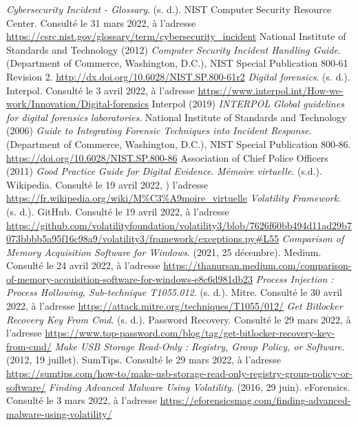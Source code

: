 \documentclass[a4paper, 12pt]{book}
\begin{document}
\begin{thebibliography}{9} 
     \textit{Cybersecurity Incident - Glossary}. (s. d.). NIST Computer Security Resource Center. Consulté le 31 mars 2022, à l’adresse \url{https://csrc.nist.gov/glossary/term/cybersecurity\_incident}
     National Institute of Standards and Technology (2012) \textit{Computer Security Incident Handling Guide}. (Department of Commerce, Washington, D.C.), NIST Special Publication 800-61 Revision 2. \url{http://dx.doi.org/10.6028/NIST.SP.800-61r2}
     \textit{Digital forensics}. (s. d.). Interpol. Consulté le 3 avril 2022, à l’adresse \url{https://www.interpol.int/How-we-work/Innovation/Digital-forensics}
     Interpol (2019) \textit{INTERPOL Global guidelines for digital forensics laboratories}.
     National Institute of Standards and Technology (2006) \textit{Guide to Integrating Forensic Techniques into Incident Response}. (Department of Commerce, Washington, D.C.), NIST Special Publication 800-86. \url{https://doi.org/10.6028/NIST.SP.800-86}
     Association of Chief Police Officers (2011) \textit{Good Practice Guide for Digital Evidence}.
     \textit{Mémoire virtuelle}. (s.d.). Wikipedia. Consulté le 19 avril 2022, ) l'adresse \url{https://fr.wikipedia.org/wiki/M\%C3\%A9moire_virtuelle}
     \textit{Volatility Framework}. (s. d.). GitHub. Consulté le 19 avril 2022, à l’adresse \url{https://github.com/volatilityfoundation/volatility3/blob/7626f60bb494d11ad29b7073bbbb5a95f16c98a9/volatility3/framework/exceptions.py\#L55}
     \textit{Comparison of Memory Acquisition Software for Windows}. (2021, 25 décembre). Medium. Consulté le 24 avril 2022, à l’adresse \url{https://thanursan.medium.com/comparison-of-memory-acquisition-software-for-windows-e8c6d981db23}
     \textit{Process Injection : Process Hollowing, Sub-technique T1055.012}. (s. d.). Mitre. Consulté le 30 avril 2022, à l’adresse \url{https://attack.mitre.org/techniques/T1055/012/}
     \textit{Get Bitlocker Recovery Key From Cmd}. (s. d.). Password Recovery. Consulté le 29 mars 2022, à l’adresse \url{https://www.top-password.com/blog/tag/get-bitlocker-recovery-key-from-cmd/}
     \textit{Make USB Storage Read-Only : Registry, Group Policy, or Software}. (2012, 19 juillet). SumTips. Consulté le 29 mars 2022, à l’adresse \url{https://sumtips.com/how-to/make-usb-storage-read-only-registry-group-policy-or-software/}
     \textit{Finding Advanced Malware Using Volatility}. (2016, 29 juin). eForensics. Consulté le 3 mars 2022, à l’adresse \url{https://eforensicsmag.com/finding-advanced-malware-using-volatility/}
\end{thebibliography}
\end{document}
